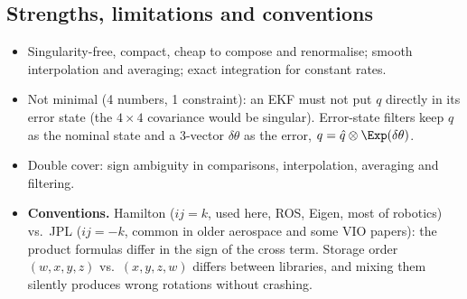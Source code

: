 \subsection{Strengths, limitations and conventions}\label{sec:rot:strengths-limitations-conventions}
\begin{itemize}
\item[$+$] Singularity-free, compact, cheap to compose and renormalise; smooth interpolation and averaging; exact integration for constant rates.
\item[$-$] Not minimal (4 numbers, 1 constraint): an EKF must not put $q$ directly in its error state (the $4\times4$ covariance would be singular). Error-state filters keep $q$ as the nominal state and a 3-vector $\delta\theta$ as the error, $q=\hat q\otimes\Exp(\delta\theta)$.
\item[$-$] Double cover: sign ambiguity in comparisons, interpolation, averaging and filtering.
\item[$!$] \textbf{Conventions.} Hamilton ($ij=k$, used here, ROS, Eigen, most of robotics) vs.\ JPL ($ij=-k$, common in older aerospace and some VIO papers): the product formulas differ in the sign of the cross term. Storage order $(w,x,y,z)$ vs.\ $(x,y,z,w)$ differs between libraries, and mixing them silently produces wrong rotations without crashing.
\end{itemize}
